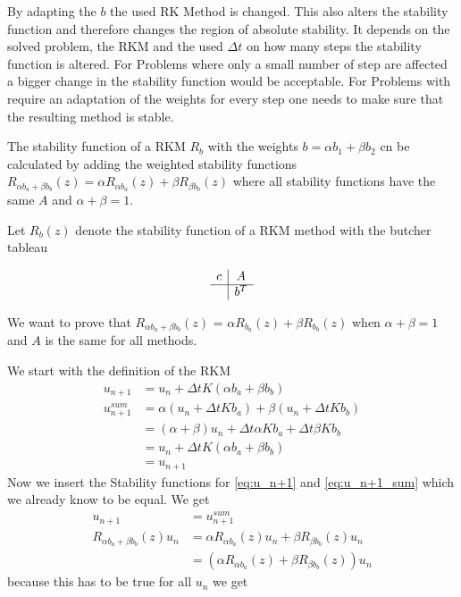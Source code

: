 \documentclass[a4paper]{scrartcl}
\numberwithin{equation}{section}
\theoremstyle{plain}
\theoremstyle{definition}
\numberwithin{theorem}{section}
\newcommand{\dt}{{\Delta t}}
\newcommand{\1}{\mathbbm{1}}
\begin{document}
By adapting the $b$ the used RK Method is changed. This also alters the stability function and therefore changes the region of absolute stability. 
It depends on the solved problem, the RKM and the used $\dt$ on how many steps the stability function is altered. For Problems where only a small number of step are affected a bigger change in the stability function would be acceptable. For Problems with require an adaptation of the weights for every step one needs to make sure that the resulting method is stable.


The stability function of a RKM $R_b$ with the weights $b = \alpha b_1 + \beta b_2$ cn be calculated by adding the weighted stability functions $R_{\alpha b_a+\beta b_b}(z) = \alpha R_{\alpha b_a}(z) + \beta R_{\beta b_b}(z) $ where all stability functions have the same $A$ and $\alpha + \beta = 1$.

Let $R_b(z)$ denote the stability function of a RKM method with the butcher tableau

$$
\begin{array}
{c|c}
c & A\\
\hline
& b^T
\end{array}
$$

We want to prove that $R_{\alpha b_a+\beta b_b}(z)$ = $\alpha R_{ b_a}(z)+\beta R_{b_b}(z)$ when $\alpha + \beta = 1$ and $A$ is the same for all methods.

We start with the definition of the RKM
\begin{align}
u_{n+1} &= u_n + \dt K (\alpha b_a+\beta b_b) \label{eq:u_n+1}  \\
u_{n+1}^{sum} &= \alpha (u_n + \dt K b_a) + \beta (u_n + \dt K b_b) \label{eq:u_n+1_sum} \\
& = (\alpha + \beta) u_n + \dt \alpha K b_a + \dt \beta K b_b \\
&= u_n + \dt K (\alpha b_a+\beta b_b) \\
&=u_{n+1} 
\end{align}
Now we insert the Stability functions for \ref{eq:u_n+1} and \ref{eq:u_n+1_sum} which we already know to be equal. We get 
\begin{align}
u_{n+1} &= u_{n+1}^{sum} \\
R_{\alpha b_a+\beta b_b}(z) u_n &= \alpha R_{\alpha b_a}(z) u_n + \beta R_{\beta b_b}(z) u_n \\
&= (\alpha R_{\alpha b_a}(z) + \beta R_{\beta b_b}(z)) u_n
\end{align}
because this has to be true for all $u_n$ we get
\end{document}
